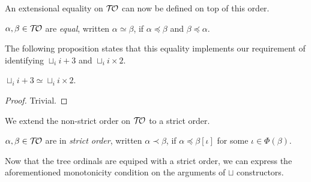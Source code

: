 An extensional equality on $\mathcal{T\!O}$ can now be defined on top of this
order.

\begin{definition}%
  $\alpha, \beta \in \mathcal{T\!O}$ are \emph{equal}, written $\alpha \simeq
  \beta$, if $\alpha \preceq \beta$ and $\beta \preceq \alpha$.
\end{definition}

The following proposition states that this equality implements our
requirement of identifying $\sqcup_i i + 3$ and $\sqcup_i i \times
2$.

\begin{proposition}
  $\sqcup_i i + 3 \simeq \sqcup_i i \times 2$.
\end{proposition}
\begin{proof}
  Trivial.
\end{proof}

We extend the non-strict order on $\mathcal{T\!O}$ to a strict order.

\begin{definition}%
  $\alpha, \beta \in \mathcal{T\!O}$ are in \emph{strict order}, written
  $\alpha \prec \beta$, if $\alpha \preceq \beta[\iota]$ for some
  $\iota \in \Phi(\beta)$.
\end{definition}



Now that the tree ordinals are equiped with a strict order, we can
express the aforementioned monotonicity condition on the arguments of
$\sqcup$ constructors.

